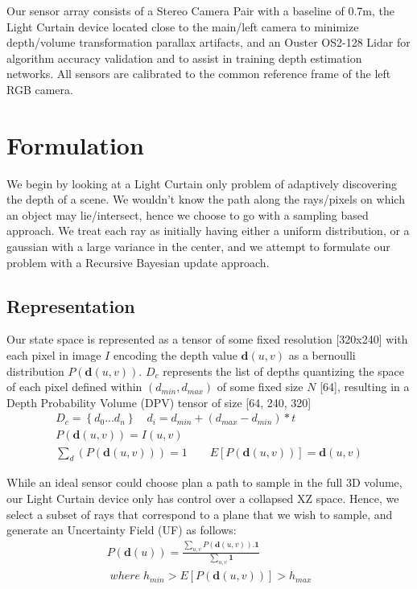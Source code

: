 \documentclass[review]{cvpr}
\begin{document}
Our sensor array consists of a Stereo Camera Pair with a baseline of 0.7m, the Light Curtain device located close to the main/left camera to minimize depth/volume transformation parallax artifacts, and an Ouster OS2-128 Lidar for algorithm accuracy validation and to assist in training depth estimation networks. All sensors are calibrated to the common reference frame of the left RGB camera.

\section{Formulation}

We begin by looking at a Light Curtain only problem of adaptively discovering the depth of a scene. We wouldn't know the path along the rays/pixels on which an object may lie/intersect, hence we choose to go with a sampling based approach. We treat each ray as initially having either a uniform distribution, or a gaussian with a large variance in the center, and we attempt to formulate our problem with a Recursive Bayesian update approach.

\subsection{Representation}

\smallskip
Our state space is represented as a tensor of some fixed resolution [320x240] with each pixel in image $I$ encoding the depth value $\mathbf{d}(u,v)$ as a bernoulli distribution $P(\mathbf{d}(u,v))$. $D_{c}$ represents the list of depths quantizing the space of each pixel defined within $(d_{min}, d_{max})$ of some fixed size $N$ [64], resulting in a Depth Probability Volume (DPV) tensor of size [64, 240, 320]
\begin{align}
   D_{c}=\left\{ d_{0}...d_{n}\right\} \quad d_{i}=d_{min}+(d_{max}-d_{min})*t 
   \label{eq:d_candi}
   \\
   P(\mathbf{d}(u,v))=I(u,v)
   \nonumber\\
   \sum_{d}\left(P(\mathbf{d}(u,v))\right)=1\qquad E[P(\mathbf{d}(u,v))]=\mathbf{d}(u,v)
   \label{eq:depth_dist}
\end{align}

While an ideal sensor could choose plan a path to sample in the full 3D volume, our Light Curtain device only has control over a collapsed XZ  space. Hence, we select a subset of rays that correspond to a plane that we wish to sample, and generate an Uncertainty Field (UF) as follows:
\begin{align}
   P(\mathbf{d}(u))=\frac{\sum_{u,v}P(\mathbf{d}{(u,v)}).\boldsymbol{1}}{\sum_{u,v}\boldsymbol{1}}
   \nonumber \\
   \;where\;h_{min}>E[P(\mathbf{d}(u,v))]>h_{max}
   \label{eq:collapse}
\end{align}
\end{document}
